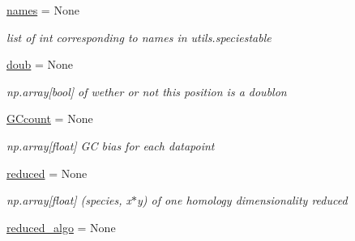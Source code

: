 \begin{DoxyCompactItemize}
\mbox{\label{class_py_c_u_b_1_1homology_1_1homology_ae8979e24b36f8ca79963aa1f03db1718}} 
\mbox{\hyperlink{class_py_c_u_b_1_1homology_1_1homology_ae8979e24b36f8ca79963aa1f03db1718}{names}} = None
\begin{DoxyCompactList}\small\item\em list of int corresponding to names in utils.\+speciestable \end{DoxyCompactList}\item 
\mbox{\label{class_py_c_u_b_1_1homology_1_1homology_adb1c7c9de932faa407921b746fea951d}} 
\mbox{\hyperlink{class_py_c_u_b_1_1homology_1_1homology_adb1c7c9de932faa407921b746fea951d}{doub}} = None
\begin{DoxyCompactList}\small\item\em np.\+array\mbox{[}bool\mbox{]} of wether or not this position is a doublon \end{DoxyCompactList}\item 
\mbox{\label{class_py_c_u_b_1_1homology_1_1homology_a862b28ceb170090b9c9959d0ec234ecf}} 
\mbox{\hyperlink{class_py_c_u_b_1_1homology_1_1homology_a862b28ceb170090b9c9959d0ec234ecf}{G\+Ccount}} = None
\begin{DoxyCompactList}\small\item\em np.\+array\mbox{[}float\mbox{]} GC bias for each datapoint \end{DoxyCompactList}\item 
\mbox{\label{class_py_c_u_b_1_1homology_1_1homology_af5cc9c64f61bf6154788e601e68ac56f}} 
\mbox{\hyperlink{class_py_c_u_b_1_1homology_1_1homology_af5cc9c64f61bf6154788e601e68ac56f}{reduced}} = None
\begin{DoxyCompactList}\small\item\em np.\+array\mbox{[}float\mbox{]} (species, x$\ast$y) of one homology dimensionality reduced \end{DoxyCompactList}\item 
\mbox{\label{class_py_c_u_b_1_1homology_1_1homology_a1332a6816c31c207bcf9b950b9befdd2}} 
\mbox{\hyperlink{class_py_c_u_b_1_1homology_1_1homology_a1332a6816c31c207bcf9b950b9befdd2}{reduced\+\_\+algo}} = None

\end{DoxyCompactItemize}

